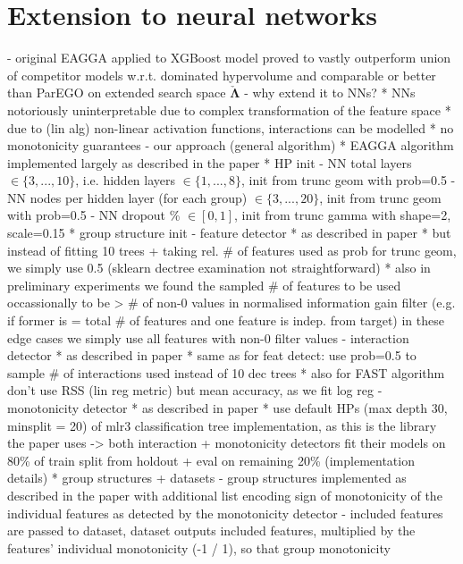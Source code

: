 \documentclass[twoside,11pt]{article}
\begin{document}
\section{Extension to neural networks}
- original EAGGA applied to XGBoost model proved to vastly outperform union of competitor models w.r.t. dominated hypervolume and comparable or better than ParEGO on
  extended search space $\check{\boldsymbol\Lambda}$ \citep[pp. 543-545]{EAGGA}
- why extend it to NNs?
  * NNs notoriously uninterpretable due to complex transformation of the feature space
  * due to (lin alg) non-linear activation functions, interactions can be modelled
  * no monotonicity guarantees
- our approach
  (general algorithm)
  * EAGGA algorithm implemented largely as described in the paper
  * HP init
    - NN total layers $\in\{3, ..., 10\}$, i.e. hidden layers $\in\{1, ..., 8\}$, init from trunc geom with prob=0.5
    - NN nodes per hidden layer (for each group) $\in\{3, ..., 20\}$, init from trunc geom with prob=0.5
    - NN dropout \% $\in[0, 1]$, init from trunc gamma with shape=2, scale=0.15
  * group structure init
    - feature detector
      * as described in paper
      * but instead of fitting 10 trees + taking rel. \# of features used as prob for trunc geom, we simply use 0.5 (sklearn dectree examination not straightforward)
      * also in preliminary experiments we found the sampled \# of features to be used occassionally to be > \# of non-0 values in normalised information gain filter
        (e.g. if former is = total \# of features and one feature is indep. from target) in these edge cases we simply use all features with non-0 filter values
    - interaction detector
      * as described in paper
      * same as for feat detect: use prob=0.5 to sample \# of interactions used instead of 10 dec trees
      * also for FAST algorithm don't use RSS (lin reg metric) but mean accuracy, as we fit log reg
    - monotonicity detector
      * as described in paper
      * use default HPs (max depth 30, minsplit = 20) of mlr3 classification tree implementation, as this is the library the paper uses
    -> both interaction + monotonicity detectors fit their models on 80\% of train split from holdout + eval on remaining 20\%
  (implementation details)
  * group structures + datasets
    - group structures implemented as described in the paper with additional list encoding sign of monotonicity of the individual features as detected by the
      monotonicity detector
    - included features are passed to dataset, dataset outputs included features, multiplied by the features' individual monotonicity (-1 / 1), so that group monotonicity
\end{document}
